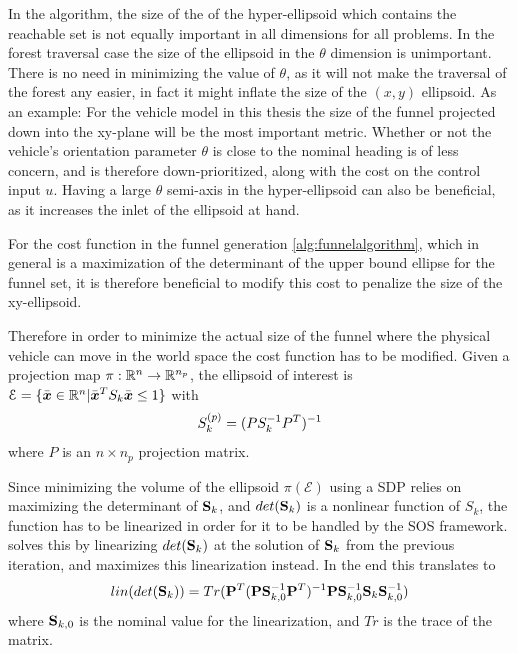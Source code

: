 In the \rrtfunnel{} algorithm, the size of the of the hyper-ellipsoid which
contains the reachable set is not equally important in all dimensions for all
problems. In the forest traversal case the size of the ellipsoid in the
\(\theta\) dimension is unimportant. There is no need in minimizing the value of
\(\theta\), as it will not make the traversal of the forest any easier, in fact
it might inflate the size of the \((x,y)\) ellipsoid. As an example: For the
vehicle model in this thesis the size of the funnel projected down into the
xy-plane will be the most important metric. Whether or not the vehicle's
orientation parameter \(\theta\) is close to the nominal heading is of less
concern, and is therefore down-prioritized, along with the cost on the control
input \(u\). Having a large \(\theta\) semi-axis in the hyper-ellipsoid can also
be beneficial, as it increases the inlet of the ellipsoid at hand.

For the cost function in the funnel generation \cref{alg:funnelalgorithm}, which
in general is a maximization of the determinant of the upper bound ellipse for
the funnel set, it is therefore beneficial to modify this cost to penalize the
size of the xy-ellipsoid.

Therefore in order to minimize the actual size of the funnel where the physical
vehicle can move in the world space the cost function has to be modified. Given
a projection map \(\pi : \mathbb{R}^n \rightarrow \mathbb{R}^{n_p}\), the ellipsoid of interest
is \(\mathcal{E} = \lbrace\bar{\boldsymbol{x}} \in \mathbb{R}^n |
  \bar{\boldsymbol{x}}^TS_{k}\bar{\boldsymbol{x}} \leq 1\rbrace\) with
\[
  S_k^{(p)} = \lparen PS_k^{-1}P^T\rparen^{-1}
\]
where \(P\) is an \(n\times n_p\) projection matrix.

Since minimizing the volume of the ellipsoid \(\pi(\mathcal{E})\) using a
\ac{SDP} relies on maximizing the determinant of \(\mathbf{S}_k\), and \(det(
\mathbf{S}_k)\) is a nonlinear function of \(S_k\), the function has to be
linearized in order for it to be handled by the \ac{SOS} framework.
\cite[Majumdar]{majumdarFunnelLibrariesRealtime2017} solves this by linearizing
\(det(\mathbf{S}_k)\) at the solution of \(\mathbf{S}_k\) from the previous
iteration, and maximizes this linearization instead. In the end this translates
to
\[
  \mathnormal{lin}\lparen det\lparen \mathbf{S}_k\rparen\rparen = Tr\lparen \mathbf{P}^T\lparen \mathbf{P}
      \mathbf{S}_{k,0}^{-1} \mathbf{P}^T\rparen^{-1} \mathbf{P} \mathbf{S}_{k,0}^{-1}
    \mathbf{S}_k \mathbf{S}_{k,0}^{-1}\rparen
\]
where \( \mathbf{S}_{k,0}\) is the nominal value for the linearization, and \(Tr\)
is the trace of the matrix.


